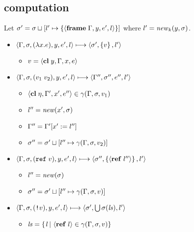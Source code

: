 \documentclass{article}
\begin{document}
\begin{minipage}{\textwidth}
\begin{minipage}[t]{0.49\textwidth}

\subsection{computation}
Let $\sigma'=\sigma\sqcup[l'\mapsto\left\{\langle\mathbf{frame}\; \Gamma,y,e',l\rangle\right\}]$ where $l'=\mathit{new}_k(y,\sigma)$.

\begin{itemize}
\item $\langle\Gamma,\sigma,(\lambda x.e),y,e',l\rangle \longmapsto \langle \sigma',\left\{v\right\}, l'\rangle$

\begin{itemize}
\item $v = \langle\mathbf{cl}\; y,\Gamma,x,e\rangle$
\end{itemize}

\item $\langle\Gamma,\sigma,(v_1\;v_2),y,e',l\rangle \longmapsto \langle\Gamma'',\sigma'',e'',l'\rangle$

\begin{itemize}
\item $\langle\mathbf{cl}\; \eta,\Gamma',x',e''\rangle\in\gamma(\Gamma,\sigma,v_1)$
\item $l''=\mathit{new}(x',\sigma)$
\item $\Gamma''=\Gamma'[x':=l'']$
\item $\sigma''=\sigma'\sqcup[l''\mapsto\gamma(\Gamma,\sigma,v_2)]$
\end{itemize}

\item $\langle\Gamma,\sigma,(\mathtt{ref}\; v),y,e',l\rangle \longmapsto \langle\sigma'', \left\{\langle\mathbf{ref}\; l''\rangle\right\},l'\rangle$

\begin{itemize}
  \item $l''=\mathit{new}(\sigma)$
  \item $\sigma''=\sigma'\sqcup[l''\mapsto\gamma(\Gamma,\sigma,v)]$
\end{itemize}

\item $\langle\Gamma,\sigma,(\text{\texttt{!}}v),y,e',l\rangle \longmapsto \langle\sigma', \bigcup\sigma(\mathit{ls}),l'\rangle$

\begin{itemize}
\item $\mathit{ls}=\left\{\left. l \,\right|\, \langle\mathbf{ref}\; l\rangle\in\gamma(\Gamma,\sigma,v) \right\}$
\end{itemize}


\end{itemize}
\end{minipage}
\end{minipage}
\end{document}
